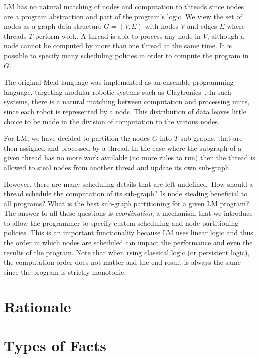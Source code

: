 LM has no natural matching of nodes and computation to threads since nodes are a
program abstraction and part of the program's logic. We view the set of nodes as
a graph data structure $G = (V, E)$ with nodes $V$ and edges $E$ where threads
$T$ perform work. A thread is able to process any node in $V$, although a node
cannot be computed by more than one thread at the same time. It is possible to
specify many scheduling policies in order to compute the program in $G$.

The original Meld language was implemented as an ensemble programming language,
targeting modular robotic systems such as
Claytronics~\cite{ashley-rollman-derosa-iros07wksp}. In such systems, there is a
natural matching between computation and processing units, since each robot is
represented by a node. This distribution of data leaves little choice to be made
in the division of computation to the various nodes.

For LM, we have decided to partition the nodes $G$ into $T$ sub-graphs, that
are then assigned and processed by a thread. In the case where the subgraph of a
given thread has no more work available (no more rules to run) then the thread
is allowed to steal nodes from another thread and update its own sub-graph.

However, there are many scheduling details that are left undefined. How should a
thread schedule the computation of its sub-graph? Is node stealing beneficial to
all programs? What is the best sub-graph partitioning for a given LM program?
The answer to all these questions is \emph{coordination}, a mechanism that we
introduce to allow the programmer to specify custom scheduling and node
partitioning policies. This is an important functionality because LM uses linear
logic and thus the order in which nodes are scheduled can impact the performance
and even the results of the program. Note that when using classical logic (or
persistent logic), the computation order does not matter and the end result is
always the same since the program is strictly monotonic.

\section{Rationale}



\section{Types of Facts}

